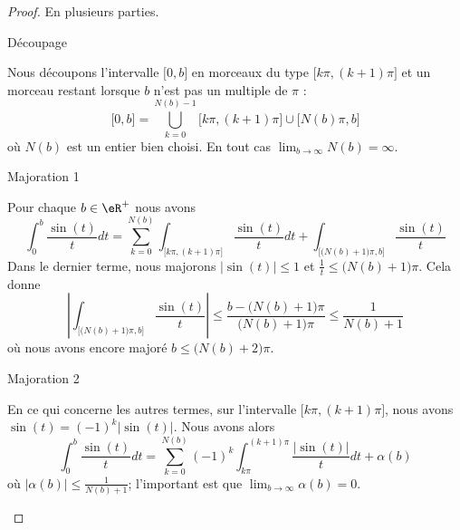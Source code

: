 \begin{proof}
    En plusieurs parties.
    \begin{subproof}
        \item[Découpage]

            Nous découpons l'intervalle \( \mathopen[ 0 , b \mathclose]\) en morceaux du type \( \mathopen[ k\pi , (k+1)\pi \mathclose]\) et un morceau restant lorsque \( b\) n'est pas un multiple de \( \pi\) :
            \begin{equation}
                \mathopen[ 0 , b \mathclose]=\bigcup_{k=0}^{N(b)-1}\mathopen[ k\pi , (k+1)\pi \mathclose]\cup\mathopen[ N(b)\pi , b \mathclose]
            \end{equation}
            où \( N(b)\) est un entier bien choisi. En tout cas \( \lim_{b\to \infty}N(b)=\infty\).

        \item[Majoration 1]

            Pour chaque \( b\in \eR^+\) nous avons
            \begin{equation}
                \int_0^b\frac{ \sin(t) }{ t }dt=\sum_{k=0}^{N(b)}\int_{\mathopen\big[ k\pi , (k+1)\pi \mathclose\big]}\frac{ \sin(t) }{ t }dt+\int_{\mathopen[ \big( N(b)+1 \big)\pi , b \mathclose]}\frac{ \sin(t) }{ t }
            \end{equation}
            Dans le dernier terme, nous majorons \( | \sin(t) |\leq 1\) et \( \frac{1}{ t }\leq \big( N(b)+1 \big)\pi\). Cela donne
            \begin{equation}
                \left|  \int_{\mathopen\big[ \big(N(b)+1\big)\pi  , b \mathclose\big]}\frac{ \sin(t) }{ t } \right|\leq \frac{ b-\big( N(b)+1 \big)\pi }{ \big( N(b)+1 \big)\pi }\leq \frac{1}{ N(b)+1 }
            \end{equation}
            où nous avons encore majoré \( b\leq \big( N(b)+2 \big)\pi\).

        \item[Majoration 2]

            En ce qui concerne les autres termes, sur l'intervalle \( \mathopen[ k\pi , (k+1)\pi \mathclose]\), nous avons \( \sin(t)=(-1)^k| \sin(t) |\). Nous avons alors
            \begin{equation}        \label{EQooHZPRooFuwRWQ}
                \int_0^b\frac{ \sin(t) }{ t }dt=\sum_{k=0}^{N(b)}(-1)^k\int_{k\pi}^{(k+1)\pi}\frac{ | \sin(t) | }{ t }dt+\alpha(b)
            \end{equation}
            où \( | \alpha(b) |\leq \frac{1}{ N(b)+1 }\); l'important est que \( \lim_{b\to \infty}\alpha(b)=0\).
            

\end{subproof}
\end{proof}
